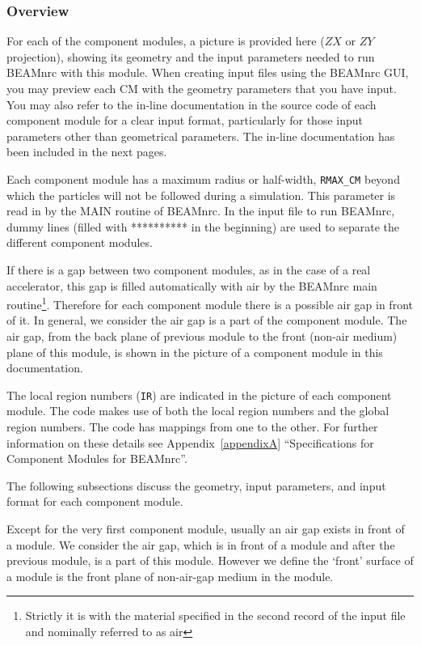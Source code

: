 \documentclass[12pt,twoside]{article}
\begin{document}
\subsubsection{Overview}

 
For each of the component modules, a picture is provided here ($ZX$ or $ZY$
projection),
showing its geometry and the input parameters needed to run BEAMnrc with this
module.   When creating input files using the BEAMnrc GUI, you may preview each
CM with the geometry parameters that you have input.  You may also refer to the
in-line documentation in the
source code of each component module for a clear input format, particularly for
those input parameters other than geometrical parameters.
The in-line documentation has been included in the next pages.

Each component module has a maximum radius or half-width, \verb+RMAX_CM+ beyond which
the
particles will not be followed during a simulation. This parameter is read in
by the MAIN routine of BEAMnrc. In the input file to run BEAMnrc,  dummy lines
(filled with ********** in the beginning) are used to separate the different
component modules.

If there is a gap between two component
modules, as in the case of a real accelerator, this gap is filled automatically
with air by the BEAMnrc main routine\footnote{Strictly it is with the material
specified in the second record of the input file and nominally referred
to as air}. Therefore for each component module there is a
possible air gap in front of it. In general, we consider the air gap is a part
of the component module. The air gap, from the back plane of previous module to
the front (non-air medium) plane of this module, is  shown in the picture of a
component module in this documentation.

The local region numbers (\verb+IR+)
are indicated in the picture of each component module.
The code makes use of both the local region numbers and the global
region numbers. The code has mappings from one to the other.  For
further information on these details see Appendix~\ref{appendixA}
 ``Specifications for Component Modules for BEAMnrc''.

The following
subsections discuss the geometry, input parameters, and input format for each
component module.

Except for the very first component module, usually an air gap exists in front
of a module. We consider the air gap, which is in front of a module and after
the previous module, is a part of this  module. However we define the `front'
surface of a module is the front plane of non-air-gap medium in the module.
\end{document}
